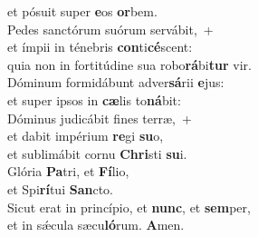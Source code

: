\oddverse et pósuit super \textbf{e}os \textbf{or}bem.\\
\evenverse Pedes sanctórum suórum servábit,~+\\
\evenverse  et ímpii in ténebris \textbf{con}ti\textbf{cé}scent:~\*\\
\evenverse quia non in fortitúdine sua robo\textbf{rá}bi\textbf{tur} vir.\\
\oddverse Dóminum formidábunt adver\textbf{sá}rii \textbf{e}jus:~\*\\
\oddverse et super ipsos in \textbf{cæ}lis to\textbf{ná}bit:\\
\evenverse Dóminus judicábit fines terræ,~+\\
\evenverse  et dabit impérium \textbf{re}gi \textbf{su}o,~\*\\
\evenverse et sublimábit cornu \textbf{Chri}sti \textbf{su}i.\\
\oddverse Glória \textbf{Pa}tri, et \textbf{Fí}lio,~\*\\
\oddverse et Spi\textbf{rí}tui \textbf{San}cto.\\
\evenverse Sicut erat in princípio, et \textbf{nunc}, et \textbf{sem}per,~\*\\
\evenverse et in sǽcula sæcu\textbf{ló}rum. \textbf{A}men.\\
